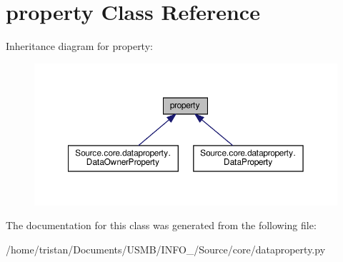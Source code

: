\hypertarget{classproperty}{}\section{property Class Reference}
\label{classproperty}


Inheritance diagram for property\+:\nopagebreak
\begin{figure}[H]
\begin{center}
\leavevmode
\includegraphics[width=350pt]{classproperty__inherit__graph}
\end{center}
\end{figure}


The documentation for this class was generated from the following file\+:\begin{DoxyCompactItemize}
\item 
/home/tristan/\+Documents/\+U\+S\+M\+B/\+I\+N\+F\+O\+\_/\+Source/core/dataproperty.\+py\end{DoxyCompactItemize}
